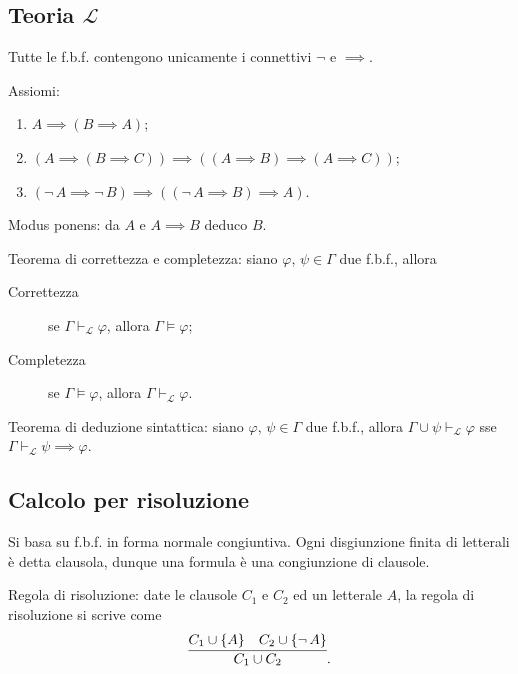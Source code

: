 \documentclass[10pt]{article}
\begin{document}
        \subsection*{Teoria \(\mathcal{L}\)}

            Tutte le f.b.f. contengono unicamente i connettivi \(\neg\) e \(\implies\).

            Assiomi:
            \begin{enumerate}
                \item \(A \implies (B \implies A)\);
                \item \((A \implies (B \implies C)) \implies ((A \implies B) \implies (A \implies C))\);
                \item \((\neg \, A \implies \neg \, B) \implies ((\neg \, A \implies B) \implies A)\).
            \end{enumerate}

            Modus ponens: da \(A\) e \(A \implies B\) deduco \(B\).

            Teorema di correttezza e completezza: siano \(\varphi, \, \psi \in \Gamma\) due f.b.f., allora
            \begin{description}
                \item[Correttezza] se \(\Gamma \vdash_\mathcal{L} \varphi\), allora \(\Gamma \models \varphi\);
                \item[Completezza] se \(\Gamma \models \varphi\), allora \(\Gamma \vdash_\mathcal{L} \varphi\).
            \end{description}

            Teorema di deduzione sintattica: siano \(\varphi, \, \psi \in \Gamma\) due f.b.f., allora
            \(\Gamma \cup {\psi} \vdash_\mathcal{L} \varphi\) sse \(\Gamma \vdash_\mathcal{L} \psi \implies \varphi\).

        \subsection*{Calcolo per risoluzione}

            Si basa su f.b.f. in forma normale congiuntiva. Ogni disgiunzione finita di letterali è detta clausola, dunque una
            formula è una congiunzione di clausole.

            Regola di risoluzione: date le clausole \(C_1\) e \(C_2\) ed un letterale \(A\), la regola di risoluzione si scrive come
            \[
                \infer{C_1 \cup C_2}{C_1 \cup \{A\} & C_2 \cup \{\neg \, A\}}.
            \]
\end{document}
